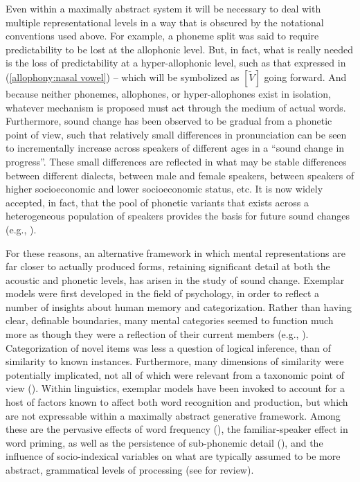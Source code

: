 Even within a maximally abstract system it will be necessary to deal
with multiple representational levels in a way that is obscured by
the notational conventions used above. For example, a phoneme split
was said to require predictability to be lost at the allophonic level.
But, in fact, what is really needed is the loss of predictability
at a hyper-allophonic level, such as that expressed in (\ref{allophony:nasal vowel})
– which will be symbolized as $[\tilde{V}]$ going forward. And because
neither phonemes, allophones, or hyper-allophones exist in isolation,
whatever mechanism is proposed must act through the medium of actual
words. Furthermore, sound change has been observed to be gradual from
a phonetic point of view, such that relatively small differences in
pronunciation can be seen to incrementally increase across speakers
of different ages in a “sound change in progress”. These small
differences are reflected in what may be stable differences between
different dialects, between male and female speakers, between speakers
of higher socioeconomic and lower socioeconomic status, etc. It is
now widely accepted, in fact, that the pool of phonetic variants that
exists across a heterogeneous population of speakers provides the
basis for future sound changes (e.g., \citealt{Guy2008}).

For these reasons, an alternative framework in which mental representations
are far closer to actually produced forms, retaining significant detail
at both the acoustic and phonetic levels, has arisen in the study
of sound change. Exemplar models were first developed in the field
of psychology, in order to reflect a number of insights about human
memory and categorization. Rather than having clear, definable boundaries,
many mental categories seemed to function much more as though they
were a reflection of their current members (e.g., \citealt{Rosch1977}).
Categorization of novel items was less a question of logical inference,
than of similarity to known instances. Furthermore, many dimensions
of similarity were potentially implicated, not all of which were relevant
from a taxonomic point of view (\citealt{Nosofsky1988,Luce1986}).
Within linguistics, exemplar models have been invoked to account for
a host of factors known to affect both word recognition and production,
but which are not expressable within a maximally abstract generative
framework. Among these are the pervasive effects of word frequency
(\citealt{Bybee2001}), the familiar-speaker effect in word priming,
as well as the persistence of sub-phonemic detail (\citealt{tilsen2009subphonemic}),
and the influence of socio-indexical variables on what are typically
assumed to be more abstract, grammatical levels of processing (see
\citealt{docherty2014evaluation} for review). 

